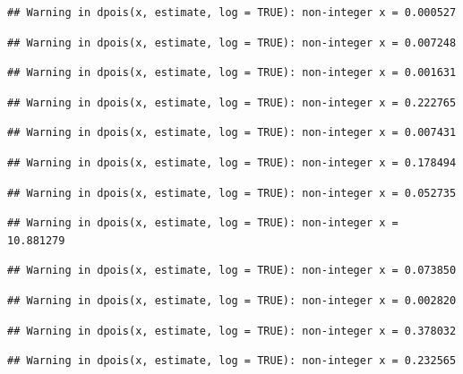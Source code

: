 \documentclass[]{article}
\begin{document}
\begin{verbatim}
## Warning in dpois(x, estimate, log = TRUE): non-integer x = 0.000527
\end{verbatim}

\begin{verbatim}
## Warning in dpois(x, estimate, log = TRUE): non-integer x = 0.007248
\end{verbatim}

\begin{verbatim}
## Warning in dpois(x, estimate, log = TRUE): non-integer x = 0.001631
\end{verbatim}

\begin{verbatim}
## Warning in dpois(x, estimate, log = TRUE): non-integer x = 0.222765
\end{verbatim}

\begin{verbatim}
## Warning in dpois(x, estimate, log = TRUE): non-integer x = 0.007431
\end{verbatim}

\begin{verbatim}
## Warning in dpois(x, estimate, log = TRUE): non-integer x = 0.178494
\end{verbatim}

\begin{verbatim}
## Warning in dpois(x, estimate, log = TRUE): non-integer x = 0.052735
\end{verbatim}

\begin{verbatim}
## Warning in dpois(x, estimate, log = TRUE): non-integer x = 10.881279
\end{verbatim}

\begin{verbatim}
## Warning in dpois(x, estimate, log = TRUE): non-integer x = 0.073850
\end{verbatim}

\begin{verbatim}
## Warning in dpois(x, estimate, log = TRUE): non-integer x = 0.002820
\end{verbatim}

\begin{verbatim}
## Warning in dpois(x, estimate, log = TRUE): non-integer x = 0.378032
\end{verbatim}

\begin{verbatim}
## Warning in dpois(x, estimate, log = TRUE): non-integer x = 0.232565
\end{verbatim}
\end{document}
